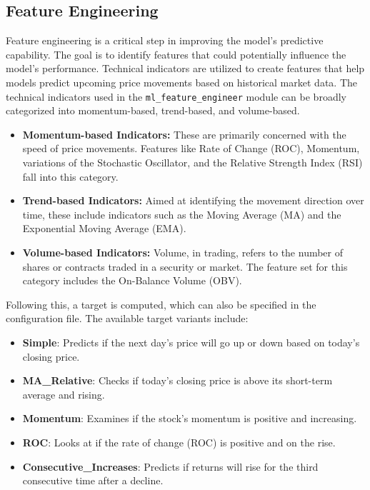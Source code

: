 \subsection{Feature Engineering}
Feature engineering is a critical step in improving the model's predictive capability.
The goal is to identify features that could potentially influence the model's performance.
Technical indicators are utilized to create features that help models predict upcoming price movements based on historical market data.
The technical indicators used in the \texttt{ml\_feature\_engineer} module can be broadly categorized into momentum-based, trend-based, and volume-based.


\begin{itemize}
    \item \textbf{Momentum-based Indicators:} These are primarily concerned with the speed of price movements. Features like Rate of Change (ROC), Momentum, variations of the Stochastic Oscillator, and the Relative Strength Index (RSI) fall into this category.

    \item \textbf{Trend-based Indicators:} Aimed at identifying the movement direction over time, these include indicators such as the Moving Average (MA) and the Exponential Moving Average (EMA).

    \item \textbf{Volume-based Indicators:} Volume, in trading, refers to the number of shares or contracts traded in a security or market. The feature set for this category includes the On-Balance Volume (OBV).
\end{itemize}


Following this, a target is computed, which can also be specified in the configuration file. The available target variants include:
\begin{itemize}
    \item \textbf{Simple}: Predicts if the next day's price will go up or down based on today's closing price.
    \item \textbf{MA\_Relative}: Checks if today's closing price is above its short-term average and rising.
    \item \textbf{Momentum}: Examines if the stock's momentum is positive and increasing.
    \item \textbf{ROC}: Looks at if the rate of change (ROC) is positive and on the rise.
    \item \textbf{Consecutive\_Increases}: Predicts if returns will rise for the third consecutive time after a decline.
\end{itemize}


